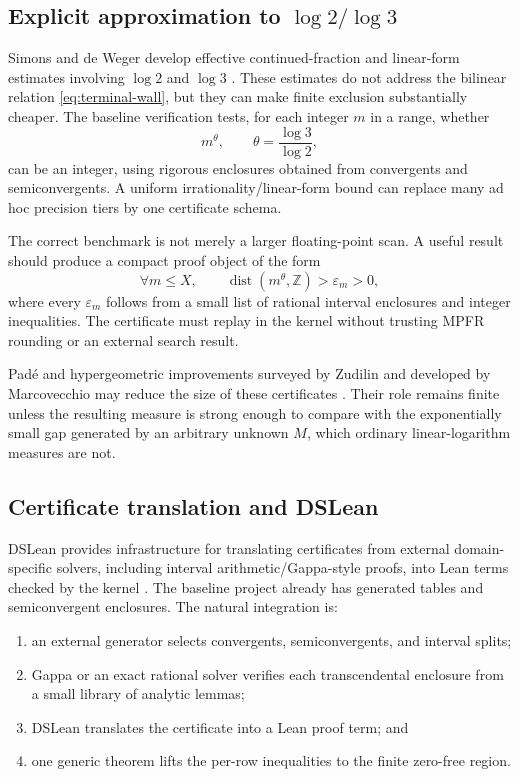 \documentclass[10pt,letterpaper]{article}
\newcommand{\Z}{\mathbb Z}
\begin{document}
\subsection{Explicit approximation to \texorpdfstring{\(\log2/\log3\)}{log 2 / log 3}}

Simons and de Weger develop effective continued-fraction and linear-form estimates involving
\(\log2\) and \(\log3\) \cite{SimonsDeWeger,Simons2005}.  These estimates do not address the
bilinear relation \cref{eq:terminal-wall}, but they can make finite exclusion substantially
cheaper.  The baseline verification tests, for each integer \(m\) in a range, whether
\[
  m^\theta,\qquad \theta=\frac{\log3}{\log2},
\]
can be an integer, using rigorous enclosures obtained from convergents and semiconvergents.
A uniform irrationality/linear-form bound can replace many ad hoc precision tiers by one
certificate schema.

The correct benchmark is not merely a larger floating-point scan.  A useful result should
produce a compact proof object of the form
\[
  \forall m\leq X,\qquad
  \operatorname{dist}(m^\theta,\Z)>\varepsilon_m>0,
\]
where every \(\varepsilon_m\) follows from a small list of rational interval enclosures and
integer inequalities.  The certificate must replay in the kernel without trusting MPFR
rounding or an external search result.

Pad\'e and hypergeometric improvements surveyed by Zudilin and developed by Marcovecchio may
reduce the size of these certificates \cite{ZudilinSurvey,Marcovecchio2009}.  Their role
remains finite unless the resulting measure is strong enough to compare with the
exponentially small gap generated by an arbitrary unknown \(M\), which ordinary
linear-logarithm measures are not.

\subsection{Certificate translation and DSLean}

DSLean provides infrastructure for translating certificates from external domain-specific
solvers, including interval arithmetic/Gappa-style proofs, into Lean terms checked by the
kernel \cite{DSLean2026}.  The baseline project already has generated tables and
semiconvergent enclosures.  The natural integration is:

\begin{enumerate}
\item an external generator selects convergents, semiconvergents, and interval splits;
\item Gappa or an exact rational solver verifies each transcendental enclosure from a small
library of analytic lemmas;
\item DSLean translates the certificate into a Lean proof term; and
\item one generic theorem lifts the per-row inequalities to the finite zero-free region.
\end{enumerate}
\end{document}
